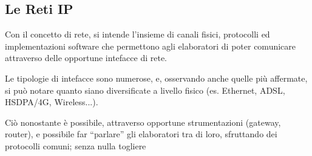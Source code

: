 \subsection{Le Reti IP}

Con il concetto di rete, si intende l'insieme di canali fisici, protocolli ed implementazioni software che permettono agli elaboratori di poter comunicare attraverso delle opportune intefacce di rete.

Le tipologie di intefacce sono numerose, e, osservando anche quelle più affermate, si può notare quanto siano diversificate a livello fisico (es. Ethernet, ADSL, HSDPA/4G, Wireless...).

Ciò nonostante è possibile, attraverso opportune strumentazioni (gateway, router), e possibile far ``parlare'' gli elaboratori tra di loro, sfruttando dei protocolli comuni; senza nulla togliere  
